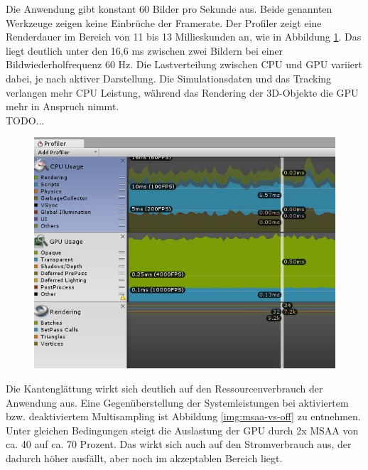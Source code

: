 Die Anwendung gibt konstant 60 Bilder pro Sekunde aus. Beide genannten Werkzeuge zeigen keine Einbrüche der Framerate. Der Profiler zeigt eine Renderdauer im Bereich von 11 bis 13 Millieskunden an, wie in Abbildung \ref{img:profiler}. Das liegt deutlich unter den 16,6 ms zwischen zwei Bildern bei einer Bildwiederholfrequenz 60 Hz. Die Lastverteilung zwischen CPU und GPU variiert dabei, je nach aktiver Darstellung. Die Simulationsdaten und das Tracking verlangen mehr CPU Leistung, während das Rendering der 3D-Objekte die GPU mehr in Anspruch nimmt.\\

TODO...\\

\begin{figure}[h!]
	\centering
	\includegraphics[width=\textwidth]{images/performance/profiler.png}
	\caption{}
	\label{img:profiler}
\end{figure}

Die Kantenglättung wirkt sich deutlich auf den Ressourcenverbrauch der Anwendung aus. Eine Gegenüberstellung der Systemleistungen bei aktiviertem bzw. deaktiviertem Multisampling ist Abbildung \ref{img:msaa-vs-off} zu entnehmen. Unter gleichen Bedingungen steigt die Auslastung der GPU durch 2x MSAA von ca. 40 auf ca. 70 Prozent. Das wirkt sich auch auf den Stromverbrauch aus, der dadurch höher ausfällt, aber noch im akzeptablen Bereich liegt.\\

